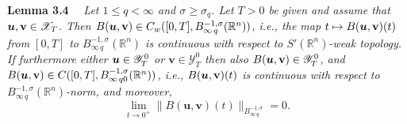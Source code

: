 \documentclass[11pt]{article}
\newcommand{\bfu}{{\mbox{\boldmath $u$}}}
\begin{document}
  {\bf Lemma 3.4} \ \ {\em Let $1\leqslant q<\infty$ and $\sigma\geqslant\sigma_q$. Let $T>0$ be given and assume that $\bfu,\mathbf{v}\in
  {\mathscr{X}_T}$. Then $B(\bfu,\mathbf{v})\in C_w([0,T],B^{-1,\sigma}_{\infty\, q}(\mathbb{R}^n))$, i.e., the map $t\mapsto B(\bfu,\mathbf{v})(t)$
  from $[0,T]$ to $B^{-1,\sigma}_{\infty\, q}(\mathbb{R}^n)$ is continuous with respect to $S'(\mathbb{R}^n)$-weak topology. If furthermore
  either $\bfu\in\mathscr{Y}_T^0$ or $\mathbf{v}\in\mathscr{Y}_T^0$ then also $B(\bfu,\mathbf{v})\in\mathscr{Y}_T^0$, and $B(\bfu,\mathbf{v})\in
  C([0,T],B^{-1,\sigma}_{\infty\, q0}(\mathbb{R}^n))$, i.e., $B(\bfu,\mathbf{v})(t)$ is continuous with respect to
  $B^{-1,\sigma}_{\infty\, q}(\mathbb{R}^n)$-norm, and moreover,}
\begin{equation}
  \lim_{t\to 0^+}\|B(\mathbf{u},\mathbf{v})(t)\|_{B^{-1,\sigma}_{\infty\,q}}=0.
\end{equation}
\end{document}
